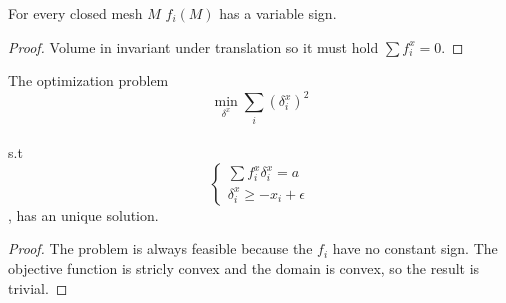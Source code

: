 \documentclass{article}
\begin{document}
\begin{Theorem}
For every closed mesh $M$ $f_i(M)$ has a variable sign.
\end{Theorem}
\begin{proof}
Volume in invariant under translation so it must hold $\sum f_{i}^{x}=0$.
\end{proof}

\begin{Theorem}\label{thm:opt}
The optimization problem
$$\min_{\delta^{x}} \sum_{i} (\delta_{i}^{x})^{2}$$ \\
s.t  $$\begin{cases}\sum f_{i}^{x}\delta_{i}^{x}=a \\
\delta_{i}^{x}\ge -x_{i}+\epsilon \end{cases}$$, has an unique solution.

\end{Theorem}
\begin{proof}
The problem is always feasible because the $f_{i}$ have no constant sign.
The objective function is stricly convex and the domain is convex, so the result is trivial.
\end{proof}
\end{document}
